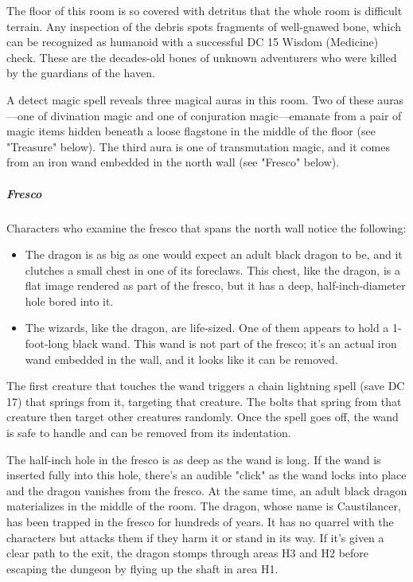 \documentclass[10pt,a4paper,twoside,bg=print,twocolumn,openany,nodeprecatedcode]{dndbook}
\begin{document}
The floor of this room is so covered with detritus that the whole room is difficult terrain. Any inspection of the debris spots fragments of well-gnawed bone, which can be recognized as humanoid with a successful DC 15 Wisdom (Medicine) check. These are the decades-old bones of unknown adventurers who were killed by the guardians of the haven.

A detect magic spell reveals three magical auras in this room. Two of these auras—one of divination magic and one of conjuration magic—emanate from a pair of magic items hidden beneath a loose flagstone in the middle of the floor (see "Treasure" below). The third aura is one of transmutation magic, and it comes from an iron wand embedded in the north wall (see "Fresco" below).

\subparagraph{Fresco}
Characters who examine the fresco that spans the north wall notice the following:


\begin{itemize}
\item The dragon is as big as one would expect an adult black dragon to be, and it clutches a small chest in one of its foreclaws. This chest, like the dragon, is a flat image rendered as part of the fresco, but it has a deep, half-inch-diameter hole bored into it.
\item The wizards, like the dragon, are life-sized. One of them appears to hold a 1-foot-long black wand. This wand is not part of the fresco; it's an actual iron wand embedded in the wall, and it looks like it can be removed.
\end{itemize}

The first creature that touches the wand triggers a chain lightning spell (save DC 17) that springs from it, targeting that creature. The bolts that spring from that creature then target other creatures randomly. Once the spell goes off, the wand is safe to handle and can be removed from its indentation.

The half-inch hole in the fresco is as deep as the wand is long. If the wand is inserted fully into this hole, there's an audible "click" as the wand locks into place and the dragon vanishes from the fresco. At the same time, an adult black dragon materializes in the middle of the room. The dragon, whose name is Caustilancer, has been trapped in the fresco for hundreds of years. It has no quarrel with the characters but attacks them if they harm it or stand in its way. If it's given a clear path to the exit, the dragon stomps through areas H3 and H2 before escaping the dungeon by flying up the shaft in area H1.
\end{document}
